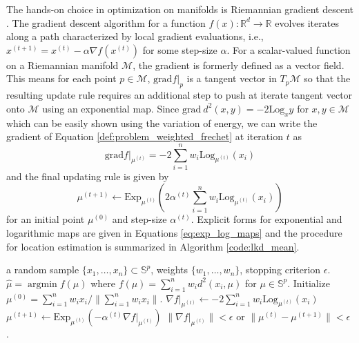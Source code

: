 \documentclass[11pt]{article}
\DeclareMathOperator*{\argmin}{argmin}
\newcommand{\calM}{\mathcal{M}}
\newcommand{\bbR}{\mathbb{R}}
\newcommand{\bbS}{\mathbb{S}}
\newcommand{\Frechet}{Fr\'{e}chet }
\begin{document}
The hands-on choice in optimization on manifolds is Riemannian gradient descent \citep{absil_optimization_2008-1}. The gradient descent algorithm for a function $f (x) :\bbR^d \rightarrow \bbR$ evolves iterates along a path characterized by local gradient evaluations, i.e., $x^{(t+1)} = x^{(t)} - \alpha \nabla f (x^{(t)}) $ for some step-size $\alpha$. For a scalar-valued function on a Riemannian manifold $\calM$, the gradient is formerly defined as a vector field. This means for each point $p \in \calM$, $\text{grad} f \rvert_p$ is a tangent vector in $T_p \calM$ so that the resulting update rule requires an additional step to push at iterate tangent vector onto $\calM$ using an exponential map. Since $\text{grad} ~d^2 (x,y) = -2 \textrm{Log}_x y$ for $x,y \in \calM$ which can be easily shown using the variation of energy, we can write the gradient of Equation \eqref{def:problem_weighted_frechet} at iteration $t$ as 
\begin{equation*}
\text{grad} f \rvert_{\mu^{(t)}} = -2 \sum_{i=1}^n w_i \text{Log}_{\mu^{(t)}} (x_i)
\end{equation*}
and the final updating rule is given by 
\begin{equation*}
\mu^{(t+1)} \leftarrow \text{Exp}_{\mu^{(t)}} \left( 2\alpha^{(t)}  \sum_{i=1}^n w_i \text{Log}_{\mu^{(t)}} (x_i) \right)
\end{equation*}
for an initial point $\mu^{(0)}$ and step-size $\alpha^{(t)}$. Explicit forms for exponential and logarithmic maps are given in Equations \eqref{eq:exp_log_maps} and the procedure for location estimation is summarized in Algorithm \ref{code:lkd_mean}. 

\begin{algorithm}
	\caption{Weighted \Frechet mean computation}
	\label{code:lkd_mean}
	\begin{algorithmic}
		\REQUIRE a random sample $\lbrace x_1,\ldots,x_n\rbrace \subset \bbS^p$, weights $\lbrace w_1, \ldots, w_n\rbrace$, stopping criterion $\epsilon$.
		\ENSURE $\hat{\mu} = \argmin f(\mu)$ where $f(\mu) =  \sum_{i=1}^n w_i d^2 (x_i, \mu)$ for $\mu \in \bbS^p$. 
		\STATE Initialize $\mu^{(0)} = \sum_{i=1}^n w_i x_i / \| \sum_{i=1}^n w_i x_i\|$.
		\REPEAT 
			\STATE $\nabla f \vert_{\mu^{(t)}} \leftarrow -2 \sum_{i=1}^n w_i \text{Log}_{\mu^{(t)}} (x_i)$ 
			\STATE $\mu^{(t+1)} \leftarrow \text{Exp}_{\mu^{(t)}} \left( -\alpha^{(t)} \nabla f \vert_{\mu^{(t)}} \right)$
		\UNTIL $\|\nabla f \vert_{\mu^{(t)}} \| < \epsilon$ or $\| \mu^{(t)} - \mu^{(t+1)} \| < \epsilon$ .
	\end{algorithmic}
\end{algorithm}
\end{document}
